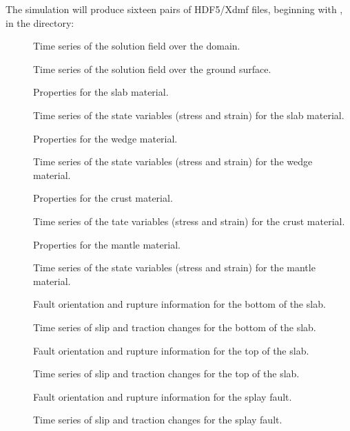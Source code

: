 The simulation will produce sixteen pairs of HDF5/Xdmf files,
beginning with , in the 
directory:
\begin{description}
\item[] Time series of the solution field over the domain.
\item[] Time series of the solution field over the ground surface.
\item[] Properties for
  the slab material.
\item[] Time series of the state variables (stress and strain) for the slab material.
\item[] Properties for
  the wedge material.
\item[] Time series of the state variables (stress and strain) for the wedge material.
\item[] Properties for
  the crust material.
\item[] Time series of the tate variables
  (stress and strain) for the crust material.
\item[] Properties for
  the mantle material.
\item[] Time series of the state variables
  (stress and strain) for the mantle material.
\item[] Fault orientation
  and rupture information for the bottom of the slab.
\item[] Time series of slip and
  traction changes for the bottom of the slab.
\item[] Fault orientation
  and rupture information for the top of the slab.
\item[] Time series of slip and
  traction changes for the top of the slab.
\item[] Fault orientation
  and rupture information for the splay fault.
\item[] Time series of slip and
  traction changes for the splay fault.
\end{description}

